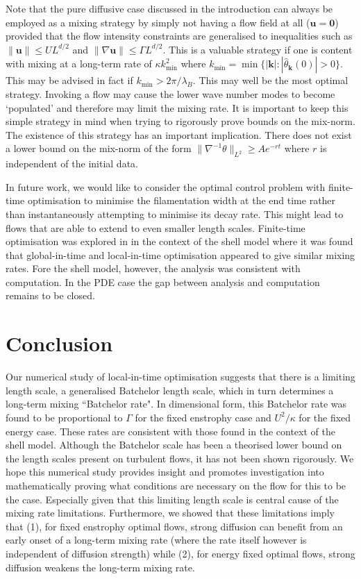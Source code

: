 \documentclass[12pt]{iopart}
\newcommand{\hmone}[1]{\|\nabla^{-1} #1\|_{L^{2}}}
\renewcommand{\vec}[1]{\mathbf{#1}}
\begin{document}
Note that the pure diffusive case discussed in the introduction can always be employed as a mixing strategy by simply not having a flow field at all ($\vec{u} =\vec{0}$) provided that the flow intensity constraints are generalised to inequalities such as $\|\vec{u}\| \leq UL^{d/2}$ and $\|\nabla \vec{u}\| \leq \Gamma L^{d/2}$.
 This is a valuable strategy if one is content with mixing at a long-term rate of $\kappa k_{\min}^2$ where $k_{\min} = \min \{ |\vec{k}|  :  |\hat{\theta}_{\vec{k}}(0)| > 0  \}$. This may be advised in fact if $k_{\min} > 2 \pi / \lambda_{B}$. This may well be the most optimal strategy. Invoking a flow may cause the lower wave number modes to become `populated' and therefore may limit the mixing rate. It is important to keep this simple strategy in mind when trying to rigorously prove bounds on the mix-norm. The existence of this strategy has an important implication. There does not exist a lower bound on the mix-norm of the form $\hmone{\theta} \geq A e^{-rt}$ where  $r$ is independent of the initial data.

In future work, we would like to consider the optimal control problem with finite-time optimisation to minimise the filamentation width at the end time rather than instantaneously attempting to minimise its decay rate. This might lead to flows that are able to extend to even smaller length scales. Finite-time optimisation was explored in \cite{Miles2017a} in the context of the shell model where it was found that global-in-time and local-in-time optimisation appeared to give similar mixing rates. Fore the shell model, however, the analysis was consistent with computation. In the PDE case the gap between analysis and computation remains to be closed.




\section{Conclusion}
\label{sec:conclusion}


Our numerical study of local-in-time optimisation suggests that there is a limiting length scale, a generalised Batchelor length scale, which in turn determines a long-term mixing ``Batchelor rate". In dimensional form, this Batchelor rate was found to be proportional to $\Gamma$ for the fixed enstrophy case and $U^{2}/\kappa$ for the fixed energy case. These rates are consistent with those found in the context of the shell model. Although the Batchelor scale has been a theorised lower bound on the length scales present on turbulent flows, it has not been shown rigorously. We hope this numerical study provides insight and promotes investigation into mathematically proving what conditions are necessary on the flow for this to be the case. Especially given that this limiting length scale is central cause of the mixing rate limitations. Furthermore, we showed that these limitations imply that (1), for fixed enstrophy optimal flows, strong diffusion can benefit from an early onset of a long-term mixing rate (where the rate itself however is independent of diffusion strength) while (2), for energy fixed optimal flows, strong diffusion weakens the long-term mixing rate. 
\end{document}
